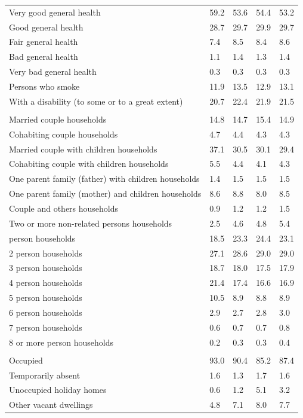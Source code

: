 \documentclass{article}
\begin{document}
\begin{table}[h]
\begin{tabular}{KTTTT}
    \hline
Very good general health & 59.2& 53.6&54.4& 53.2\\
Good general health & 28.7& 29.7& 29.9& 29.7\\
Fair general health & 7.4& 8.5&8.4& 8.6\\
Bad general health & 1.1& 1.4&1.3& 1.4\\
Very bad general health & 0.3& 0.3&0.3& 0.3\\
    \hline
Persons who smoke & 11.9& 13.5&12.9& 13.1\\
    \hline
With a disability (to some or to a great extent) & 20.7& 22.4&21.9& 21.5\\
\hline
    \\ 
    \hline
Married couple households & 14.8& 14.7& 15.4& 14.9\\
Cohabiting couple households & 4.7& 4.4& 4.3& 4.3\\
Married couple with children households & 37.1& 30.5& 30.1& 29.4\\
Cohabiting couple with children households & 5.5& 4.4& 4.1& 4.3\\
One parent family (father) with  children households & 1.4& 1.5& 1.5& 1.5\\
One parent family (mother) and children households & 8.6& 8.8& 8.0& 8.5\\
Couple and others households  & 0.9& 1.2& 1.2& 1.5\\
Two or more non-related persons households & 2.5& 4.6& 4.8& 5.4\\
     person households & 18.5& 23.3& 24.4& 23.1\\
2 person households & 27.1& 28.6& 29.0& 29.0\\
3 person households & 18.7& 18.0& 17.5& 17.9\\
4 person households & 21.4& 17.4& 16.6& 16.9\\
5 person households & 10.5&  8.9&  8.8&  8.9\\
6 person households & 2.9& 2.7& 2.8& 3.0\\
7 person households & 0.6& 0.7& 0.7& 0.8\\
8 or more person households & 0.2& 0.3& 0.3& 0.4\\
\hline
    \\ 
    \hline
Occupied & 93.0& 90.4& 85.2& 87.4\\
Temporarily absent & 1.6& 1.3& 1.7& 1.6\\
Unoccupied holiday homes & 0.6& 1.2& 5.1& 3.2\\
Other vacant dwellings & 4.8& 7.1& 8.0& 7.7\\
\hline
\end{tabular}
\end{table}
\end{document}
